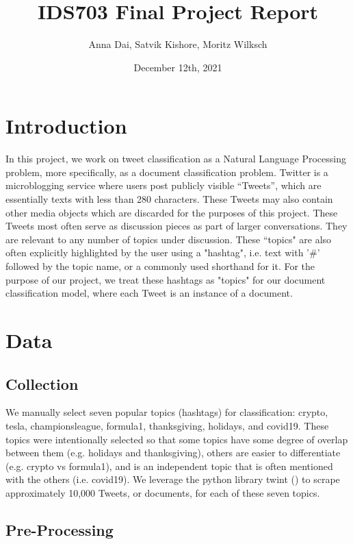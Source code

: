 \documentclass[11pt]{article}
\title{\vspace{-1.5cm}IDS703 Final Project Report}
\author{Anna Dai, Satvik Kishore, Moritz Wilksch}
\date{December 12th, 2021}
\begin{document}
\maketitle

\section{Introduction}

In this project, we work on tweet classification as a Natural Language Processing problem, more specifically, as a document classification problem. Twitter is a microblogging service where users post publicly visible ``Tweets'', which are essentially texts with less than 280 characters. These Tweets may also contain other media objects which are discarded for the purposes of this project. These Tweets most often serve as discussion pieces as part of larger conversations. They are relevant to any number of topics under discussion. These ``topics" are also often explicitly highlighted by the user using a "hashtag", i.e. text with '\#' followed by the topic name, or a commonly used shorthand for it. For the purpose of our project, we treat these hashtags as "topics" for our document classification model, where each Tweet is an instance of a document.

\section{Data}

\subsection{Collection}
We manually select seven popular topics (hashtags) for classification: crypto, tesla, championsleague, formula1, thanksgiving, holidays, and covid19.
These topics were intentionally selected so that some topics have some degree of overlap between them (e.g. holidays and thanksgiving), others are easier to differentiate (e.g. crypto vs formula1), and is an independent topic that is often mentioned with the others (i.e. covid19). We leverage the python library twint (\cite{twint}) to scrape approximately 10,000 Tweets, or documents, for each of these seven topics.


\subsection{Pre-Processing}
\end{document}
